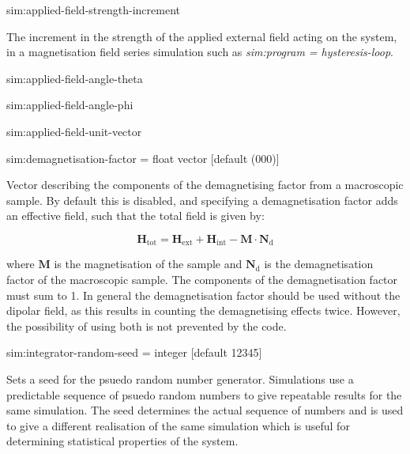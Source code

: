{\zicf sim:applied-field-strength-increment}
   The increment in the strength of the applied external field acting on the system, in a magnetisation field series simulation such as \textit{sim:program = hysteresis-loop}.

{\zicf sim:applied-field-angle-theta}

{\zicf sim:applied-field-angle-phi}

{\zicf sim:applied-field-unit-vector}

{\zicf sim:demagnetisation-factor = float vector [default (000)]} Vector describing the components of the demagnetising factor from a macroscopic sample. By default this is disabled, and specifying a demagnetisation factor adds an effective field, such that the total field is given by:

\begin{equation*}
\mathbf{H}_{\mathrm{tot}} = \mathbf{H}_{\mathrm{ext}} + \mathbf{H}_{\mathrm{int}} - \mathbf{M} \cdot \mathbf{N}_{\mathrm{d}}
\end{equation*}

\noindent where $\mathbf{M}$ is the magnetisation of the sample and $\mathbf{N}_{\mathrm{d}}
$ is the demagnetisation factor of the macroscopic sample. The components of the demagnetisation factor must sum to 1. In general the demagnetisation factor should be used without the dipolar field, as this results in counting the demagnetising effects twice. However, the possibility of using both is not prevented by the code.



{\zicf sim:integrator-random-seed = integer [default 12345]} Sets a seed for the psuedo random number generator. Simulations use a predictable sequence of psuedo random numbers to give repeatable results for the same simulation. The seed determines the actual sequence of numbers and is used to give a different realisation of the same simulation which is useful for determining statistical properties of the system.

